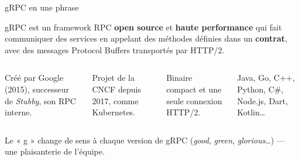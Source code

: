 \documentclass[aspectratio=169,11pt]{beamer}
\begin{document}
\begin{frame}{gRPC en une phrase}
  \begin{tcolorbox}[gdark,fontupper=\large,left=12pt,right=12pt,top=10pt,bottom=10pt]
    \color{white}gRPC est un framework RPC \textbf{open source} et \textbf{haute performance} qui fait communiquer
    des services en appelant des méthodes définies dans un \textbf{contrat}, avec des messages
    {\color{TealGlow}Protocol Buffers} transportés par {\color{TealGlow}HTTP/2}.
  \end{tcolorbox}
  \vspace{0.1cm}
  \begin{columns}[T,onlytextwidth]
    \begin{carte}[height=2.2cm]\footnotesize Créé par Google (2015), successeur de \emph{Stubby}, son RPC interne.\end{carte}
    \begin{carte}[height=2.2cm]\footnotesize Projet de la CNCF depuis 2017, comme Kubernetes.\end{carte}
    \begin{carte}[height=2.2cm]\footnotesize Binaire compact et une seule connexion HTTP/2.\end{carte}
    \begin{carte}[height=2.2cm]\footnotesize Java, Go, C++, Python, C\#, Node.js, Dart, Kotlin…\end{carte}
  \end{columns}
  \vspace{0.05cm}
  {\scriptsize\color{Muted}\faLightbulb[regular]\enspace Le « g » change de sens à chaque version de gRPC (\emph{good}, \emph{green}, \emph{glorious}…) — une plaisanterie de l'équipe.}
\end{frame}
\end{document}
